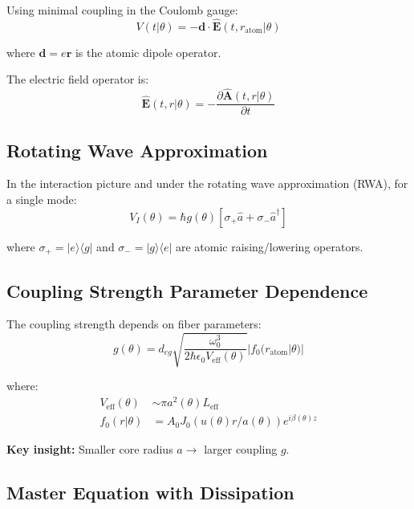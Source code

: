 \documentclass[12pt,a4paper]{article}
\begin{document}
Using minimal coupling in the Coulomb gauge:
\begin{equation}
V(t|\theta) = -\mathbf{d} \cdot \hat{\mathbf{E}}(t, r_{\text{atom}}|\theta)
\end{equation}

where $\mathbf{d} = e\mathbf{r}$ is the atomic dipole operator.

The electric field operator is:
\begin{equation}
\hat{\mathbf{E}}(t,r|\theta) = -\frac{\partial \hat{\mathbf{A}}(t,r|\theta)}{\partial t}
\end{equation}

\subsection{Rotating Wave Approximation}

In the interaction picture and under the rotating wave approximation (RWA), for a single mode:
\begin{equation}
V_I(\theta) = \hbar g(\theta)[\sigma_+ \hat{a} + \sigma_- \hat{a}^\dagger]
\end{equation}

where $\sigma_+ = |e\rangle\langle g|$ and $\sigma_- = |g\rangle\langle e|$ are atomic raising/lowering operators.

\subsection{Coupling Strength Parameter Dependence}

The coupling strength depends on fiber parameters:
\begin{equation}
g(\theta) = d_{eg}\sqrt{\frac{\omega_0^3}{2\hbar\epsilon_0 V_{\text{eff}}(\theta)}}|f_0(r_{\text{atom}}|\theta)|
\end{equation}

where:
\begin{align}
V_{\text{eff}}(\theta) &\sim \pi a^2(\theta) L_{\text{eff}} \\
f_0(r|\theta) &= A_0 J_0(u(\theta)r/a(\theta))e^{i\beta(\theta)z}
\end{align}

\textbf{Key insight:} Smaller core radius $a \to$ larger coupling $g$.

\subsection{Master Equation with Dissipation}
\end{document}
